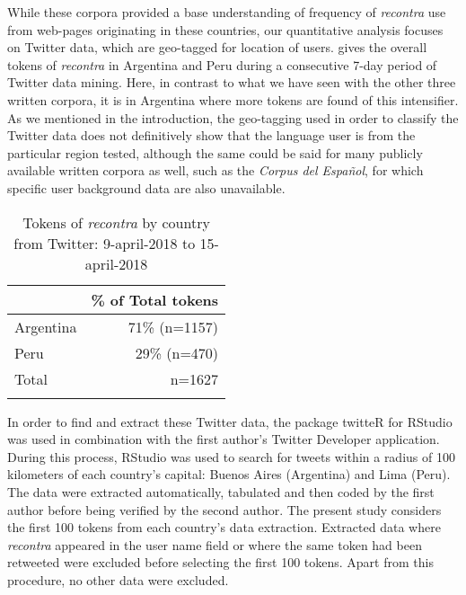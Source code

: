 \documentclass[output=paper,colorlinks,citecolor=brown,
]{langscibook}
\begin{document}
While these corpora provided a base understanding of frequency of \textit{recontra} use from web-pages originating in these countries, our quantitative analysis focuses on Twitter data, which are geo-tagged for location of users.  gives the overall tokens of \textit{recontra} in Argentina and Peru during a consecutive 7-day period of Twitter data mining. Here, in contrast to what we have seen with the other three written corpora, it is in Argentina where more tokens are found of this intensifier. As we mentioned in the introduction, the geo-tagging used in order to classify the Twitter data does not definitively show that the language user is from the particular region tested, although the same could be said for many publicly available written corpora as well, such as the \textit{Corpus del Español}, for which specific user background data are also unavailable. 

\begin{table}
\caption{Tokens of \textit{recontra} by country from Twitter: 9-april-2018 to 15-april-2018}
\label{tab:hair:2:tokens}
 \begin{tabular}{l r}
  \lsptoprule
             & \% of Total tokens \\
  \midrule
  Argentina & 71\% (n=1157)\\
  Peru  & 29\% (n=470)\\
  Total & n=1627\\
  \lspbottomrule
  \end{tabular}
\end{table}

In order to find and extract these Twitter data, the package twitteR for RStudio was used in combination with the first author's Twitter Developer application. During this process, RStudio was used to search for tweets within a radius of 100 kilometers of each country's capital: Buenos Aires (Argentina) and Lima (Peru). The data were extracted automatically, tabulated and then coded by the first author before being verified by the second author. The present study considers the first 100 tokens from each country's data extraction. Extracted data where \textit{recontra} appeared in the user name field or where the same token had been retweeted were excluded before selecting the first 100 tokens. Apart from this procedure, no other data were excluded. 
 
\end{document}
